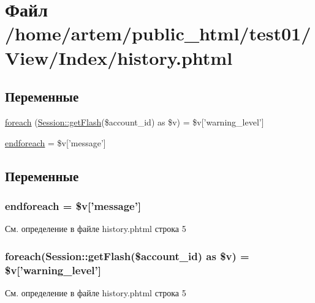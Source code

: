 \hypertarget{history_8phtml}{\section{Файл /home/artem/public\-\_\-html/test01/\-View/\-Index/history.phtml}
\label{history_8phtml}
}
\subsection*{Переменные}
\begin{DoxyCompactItemize}
\item 
\hyperlink{history_8phtml_a1c191ff1be2612f80eabc75951f1841b}{foreach} (\hyperlink{class_session_ae4c4b98671bdd1fbfe4ae9defb5405ad}{Session\-::get\-Flash}(\$account\-\_\-id) as \$v) = \$v\mbox{[}'warning\-\_\-level'\mbox{]}
\item 
\hyperlink{history_8phtml_a672d9707ef91db026c210f98cc601123}{endforeach} = \$v\mbox{[}'message'\mbox{]}
\end{DoxyCompactItemize}


\subsection{Переменные}
\hypertarget{history_8phtml_a672d9707ef91db026c210f98cc601123}{
\subsubsection[{endforeach}]{\setlength{\rightskip}{0pt plus 5cm}endforeach = \$v\mbox{[}'message'\mbox{]}}}\label{history_8phtml_a672d9707ef91db026c210f98cc601123}


См. определение в файле history.\-phtml строка 5

\hypertarget{history_8phtml_a1c191ff1be2612f80eabc75951f1841b}{
\subsubsection[{foreach}]{\setlength{\rightskip}{0pt plus 5cm}foreach({\bf Session\-::get\-Flash}(\$account\-\_\-id) as \$v) = \$v\mbox{[}'warning\-\_\-level'\mbox{]}}}\label{history_8phtml_a1c191ff1be2612f80eabc75951f1841b}


См. определение в файле history.\-phtml строка 5

